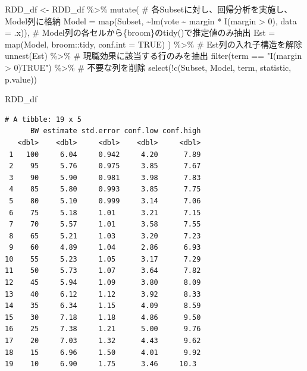 \documentclass[
  a4paper,
  pandoc,
  ja=standard,
  jafont=haranoaji]{bxjsbook}
\newenvironment{Shaded}{\begin{snugshade}}{\end{snugshade}}
\newcommand{\AttributeTok}[1]{\textcolor[rgb]{0.00,0.48,0.65}{#1}}
\newcommand{\CommentTok}[1]{\textcolor[rgb]{0.37,0.37,0.37}{#1}}
\newcommand{\ConstantTok}[1]{\textcolor[rgb]{0.56,0.35,0.01}{#1}}
\newcommand{\DecValTok}[1]{\textcolor[rgb]{0.68,0.00,0.00}{#1}}
\newcommand{\FunctionTok}[1]{\textcolor[rgb]{0.28,0.35,0.67}{#1}}
\newcommand{\NormalTok}[1]{\textcolor[rgb]{0.00,0.48,0.65}{#1}}
\newcommand{\OtherTok}[1]{\textcolor[rgb]{0.00,0.48,0.65}{#1}}
\newcommand{\SpecialCharTok}[1]{\textcolor[rgb]{0.37,0.37,0.37}{#1}}
\newcommand{\StringTok}[1]{\textcolor[rgb]{0.13,0.47,0.30}{#1}}
\begin{document}
\begin{Shaded}
\begin{Highlighting}[numbers=left,,]
\NormalTok{RDD\_df }\OtherTok{\textless{}{-}}\NormalTok{ RDD\_df }\SpecialCharTok{\%\textgreater{}\%}
  \FunctionTok{mutate}\NormalTok{(}
    \CommentTok{\# 各Subsetに対し、回帰分析を実施し、Model列に格納}
    \AttributeTok{Model  =} \FunctionTok{map}\NormalTok{(Subset, }\SpecialCharTok{\textasciitilde{}}\FunctionTok{lm}\NormalTok{(vote }\SpecialCharTok{\textasciitilde{}}\NormalTok{ margin }\SpecialCharTok{*} \FunctionTok{I}\NormalTok{(margin }\SpecialCharTok{\textgreater{}} \DecValTok{0}\NormalTok{), }\AttributeTok{data =}\NormalTok{ .x)),}
    \CommentTok{\# Model列の各セルから\{broom\}のtidy()で推定値のみ抽出}
    \AttributeTok{Est    =} \FunctionTok{map}\NormalTok{(Model, broom}\SpecialCharTok{::}\NormalTok{tidy, }\AttributeTok{conf.int =} \ConstantTok{TRUE}\NormalTok{)}
\NormalTok{    ) }\SpecialCharTok{\%\textgreater{}\%}
  \CommentTok{\# Est列の入れ子構造を解除}
  \FunctionTok{unnest}\NormalTok{(Est) }\SpecialCharTok{\%\textgreater{}\%} 
  \CommentTok{\# 現職効果に該当する行のみを抽出}
  \FunctionTok{filter}\NormalTok{(term }\SpecialCharTok{==} \StringTok{"I(margin \textgreater{} 0)TRUE"}\NormalTok{) }\SpecialCharTok{\%\textgreater{}\%}
  \CommentTok{\# 不要な列を削除}
  \FunctionTok{select}\NormalTok{(}\SpecialCharTok{!}\FunctionTok{c}\NormalTok{(Subset, Model, term, statistic, p.value))}

\NormalTok{RDD\_df}
\end{Highlighting}
\end{Shaded}

\begin{verbatim}
# A tibble: 19 x 5
      BW estimate std.error conf.low conf.high
   <dbl>    <dbl>     <dbl>    <dbl>     <dbl>
 1   100     6.04     0.942     4.20      7.89
 2    95     5.76     0.975     3.85      7.67
 3    90     5.90     0.981     3.98      7.83
 4    85     5.80     0.993     3.85      7.75
 5    80     5.10     0.999     3.14      7.06
 6    75     5.18     1.01      3.21      7.15
 7    70     5.57     1.01      3.58      7.55
 8    65     5.21     1.03      3.20      7.23
 9    60     4.89     1.04      2.86      6.93
10    55     5.23     1.05      3.17      7.29
11    50     5.73     1.07      3.64      7.82
12    45     5.94     1.09      3.80      8.09
13    40     6.12     1.12      3.92      8.33
14    35     6.34     1.15      4.09      8.59
15    30     7.18     1.18      4.86      9.50
16    25     7.38     1.21      5.00      9.76
17    20     7.03     1.32      4.43      9.62
18    15     6.96     1.50      4.01      9.92
19    10     6.90     1.75      3.46     10.3 
\end{verbatim}
\end{document}
